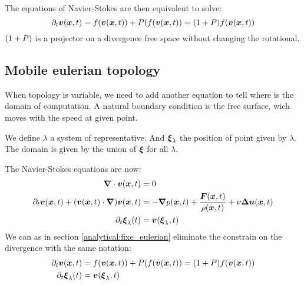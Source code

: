 The equations of Navier-Stokes are then equivalent to solve:
\begin{equation}
  \partial_t {\boldsymbol {v}}({\boldsymbol {x}} ,t)=f({\boldsymbol {v}}({\boldsymbol {x}},t))+P(f({\boldsymbol {v}}({\boldsymbol {x}},t))=(1+P)f({\boldsymbol {v}}({\boldsymbol {x}},t))
\end{equation}
$(1+P)$ is a projector on a divergence free space without changing the rotational.

\subsection{Mobile eulerian topology }
When topology is variable, we need to add another equation to tell where is the domain of computation.
A natural boundary condition is the free surface, wich moves with the speed at given point.

We define $\lambda$ a system of representative. And ${\boldsymbol {\xi}}_{\lambda}$ the position of point given by $\lambda$.
The domain is given by the union of ${\boldsymbol {\xi}}$ for all $\lambda$.

The Navier-Stokes equations are now:
\begin{subequations}
\begin{align}
\label{analytical:navierStokesMobA}
{\boldsymbol {\nabla}} \cdot {\boldsymbol {v}}({\boldsymbol {x}} ,t)&=0\\
\label{analytical:navierStokesMobB}
\partial_t {\boldsymbol {v}}({\boldsymbol {x}} ,t)+({\boldsymbol {v}}({\boldsymbol {x}},t)\cdot{\boldsymbol {\nabla}} ) {\boldsymbol {v}}({\boldsymbol {x}} ,t)&=-{\boldsymbol {\nabla}} p({\boldsymbol {x}},t)+\frac{{\boldsymbol {F}}({\boldsymbol {x}},t)}{\rho({\boldsymbol {x}},t)}+\nu {\boldsymbol {\Delta}} {\boldsymbol {u}}({\boldsymbol {x}},t)\\
\partial_t {\boldsymbol {\xi}}_{\lambda}(t)&={\boldsymbol {v}}({\boldsymbol {\xi}}_{\lambda},t)
\end{align}
\end{subequations}
We can as in section \ref{analytical:fixe_eulerian} eliminate the constrain on the divergence with the same notation:
\begin{subequations}
\begin{align}
\partial_t {\boldsymbol {v}}({\boldsymbol {x}} ,t)&=f({\boldsymbol {v}}({\boldsymbol {x}},t))+P(f({\boldsymbol {v}}({\boldsymbol {x}},t))=(1+P)f({\boldsymbol {v}}({\boldsymbol {x}},t))\\
\partial_t {\boldsymbol {\xi}}_{\lambda}(t)&={\boldsymbol {v}}({\boldsymbol {\xi}}_{\lambda},t)\label{ana:move:equ}
\end{align}
\end{subequations}

